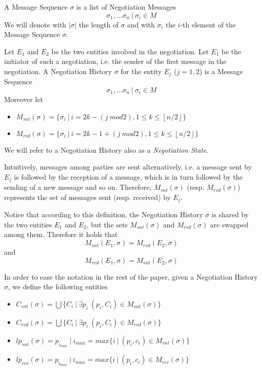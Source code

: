 \documentclass{article}
\begin{document}
\begin{definition}
A Message Sequence $\sigma$ is a list of Negotiation Messages
$$\sigma_{1}, \ldots \sigma_n\ |\ \sigma_{i} \in M$$
We will denote with $|\sigma|$ the length of $\sigma$ and with $\sigma_i$ the $i$-th element of the Message Sequence $\sigma$.
\end{definition}

\begin{definition}
Let $E_{1}$ and $E_{2}$ be the two entities involved in the negotiation. Let $E_{1}$ be the initiator of such a negotiation, i.e. the sender of the first message in the negotiation. A Negotiation History $\sigma$ for the entity $E_{j}$ ($j = 1, 2$) is a Message Sequence
$$\sigma_{1}, \ldots \sigma_{n}\ |\ \sigma_{i} \in M$$
Moreover let
	\begin{itemize}
	\item $M_{snt}(\sigma) = \{ \sigma_{i}\ |\ i = 2k - (j\ mod 2), 1 \leq k \leq \left\lfloor n/2 \right\rfloor \}$
	\item $M_{rvd}(\sigma) = \{ \sigma_{i}\ |\ i = 2k - 1 + (j\ mod 2), 1 \leq k \leq \left\lfloor n/2 \right\rfloor \}$
	\end{itemize}
\end{definition}

We will refer to a Negotiation History also as a \textit{Negotiation State}.

Intuitively, messages among parties are sent alternatively, i.e. a message sent by $E_{j}$ is followed by the reception of a message, which is in turn followed by the sending of a new message and so on. Therefore, $M_{snt}(\sigma)$ (resp. $M_{rvd}(\sigma)$) represents the set of messages sent (resp. received) by $E_{j}$.

Notice that according to this definition, the Negotiation History $\sigma$ is shared by the two entities $E_{1}$ and $E_{2}$, but the sets $M_{snt}(\sigma)$ and $M_{rvd}(\sigma)$ are swapped among them. Therefore it holds that $$ M_{snt}(E_{1}, \sigma) = M_{rvd}(E_{2}, \sigma) $$ and $$ M_{rvd}(E_{1}, \sigma) = M_{snt}(E_{2}, \sigma) $$

In order to ease the notation in the rest of the paper, given a Negotiation History $\sigma$, we define the following entities

\begin{itemize}
\item $C_{snt}(\sigma) = \bigcup\{ C_{i}\ |\ \exists p_{i}\ (p_{i}, C_{i}) \in M_{snt}(\sigma) \}$
\item $C_{rvd}(\sigma) = \bigcup\{ C_{i}\ |\ \exists p_{i}\ (p_{i}, C_{i}) \in M_{rvd}(\sigma) \}$
\item $lp_{snt}(\sigma) = p_{i_{max}}\ |\ i_{max} = max\{i\ |\ (p_{i}, c_{i}) \in M_{snt}(\sigma) \}$
\item $lp_{rcv}(\sigma) = p_{i_{max}}\ |\ i_{max} = max\{i\ |\ (p_{i}, c_{i}) \in M_{rcv}(\sigma) \}$
\end{itemize}
\end{document}
